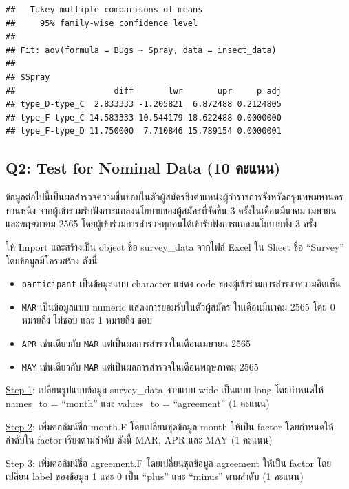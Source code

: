\documentclass[
]{article}
\providecommand{\tightlist}{%
  \setlength{\itemsep}{0pt}\setlength{\parskip}{0pt}}
\begin{document}
\begin{verbatim}
##   Tukey multiple comparisons of means
##     95% family-wise confidence level
## 
## Fit: aov(formula = Bugs ~ Spray, data = insect_data)
## 
## $Spray
##                    diff       lwr       upr     p adj
## type_D-type_C  2.833333 -1.205821  6.872488 0.2124805
## type_F-type_C 14.583333 10.544179 18.622488 0.0000000
## type_F-type_D 11.750000  7.710846 15.789154 0.0000001
\end{verbatim}

\subsection{Q2: Test for Nominal Data (10
คะแนน)}\label{q2-test-for-nominal-data-10-uxe04uxe30uxe41uxe19uxe19}

ข้อมูลต่อไปนี้เป็นผลสำรวจความชื่นชอบในตัวผู้สมัครชิงตำแหน่งผู้ว่าราชการจังหวัดกรุงเทพมหานครท่านหนึ่ง
จากผู้เข้าร่วมรับฟังการแถลงนโยบายของผู้สมัครที่จัดขึ้น 3 ครั้งในเดือนมีนาคม เมษายน
และพฤษภาคม 2565 โดยผู้เข้าร่วมการสำรวจทุกคนได้เข้ารับฟังการแถลงนโยบายทั้ง 3 ครั้ง

ให้ Import และสร้างเป็น object ชื่อ survey\_data จากไฟล์ Excel ใน Sheet ชื่อ
``Survey'' โดยข้อมูลมีโครงสร้าง ดังนี้

\begin{itemize}
\tightlist
\item
  \texttt{participant} เป็นข้อมูลแบบ character แสดง code
  ของผู้เข้าร่วมการสำรวจความคิดเห็น
\item
  \texttt{MAR} เป็นข้อมูลแบบ numeric แสดงการยอมรับในตัวผู้สมัคร ในเดือนมีนาคม 2565
  โดย 0 หมายถึง ไม่ชอบ และ 1 หมายถึง ชอบ
\item
  \texttt{APR} เช่นเดียวกับ \texttt{MAR} แต่เป็นผลการสำรวจในเดือนเมษายน 2565
\item
  \texttt{MAY} เช่นเดียวกับ \texttt{MAR} แต่เป็นผลการสำรวจในเดือนพฤษภาคม 2565
\end{itemize}

\ul{Step 1}: เปลี่ยนรูปแบบข้อมูล survey\_data จากแบบ wide เป็นแบบ long
โดยกำหนดให้ names\_to = ``month'' และ values\_to = ``agreement'' (1
คะแนน)

\ul{Step 2}: เพิ่มคอลัมน์ชื่อ month.F โดยเปลี่ยนชุดข้อมูล month ให้เป็น factor
โดยกำหนดให้ลำดับใน factor เรียงตามลำดับ ดังนี้ MAR, APR และ MAY (1 คะแนน)

\ul{Step 3}: เพิ่มคอลัมน์ชื่อ agreement.F โดยเปลี่ยนชุดข้อมูล agreement ให้เป็น
factor โดยเปลี่ยน label ของข้อมูล 1 และ 0 เป็น ``plus'' และ ``minus'' ตามลำดับ
(1 คะแนน)
\end{document}
